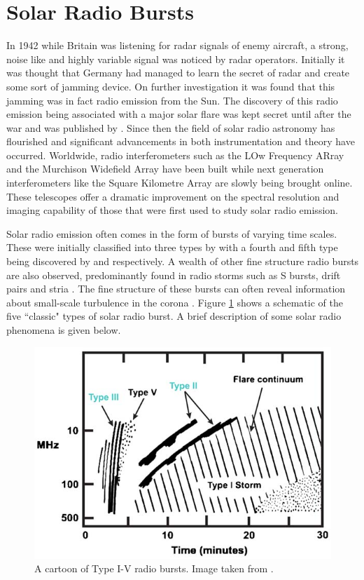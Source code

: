 \section{Solar Radio Bursts}
In 1942 while Britain was listening for radar signals of enemy aircraft, a strong, noise like and highly variable signal was noticed by radar operators. Initially it was thought that Germany had managed to learn the secret of radar and create some sort of jamming device. On further investigation it was found that this jamming was in fact radio emission from the Sun. The discovery of this radio emission being associated with a major solar flare was kept secret until after the war and was published by \cite{Appleton1946}.
Since then the field of solar radio astronomy has flourished and significant advancements in both instrumentation and theory have occurred. Worldwide, radio interferometers such as the LOw Frequency ARray \cite[LOFAR;][]{VanHaarlem2013} and the Murchison Widefield Array \citep[MWA;][]{Lonsdale2009} have been built while next generation interferometers like the Square Kilometre Array \citep[SKA;][]{McMullin2020} are slowly being brought online. These telescopes offer a dramatic improvement on the spectral resolution and imaging capability of those that were first used to study solar radio emission.

Solar radio emission often comes in the form of bursts of varying time scales. These were initially classified into three types by \cite{Wild1950b} with a fourth and fifth type being discovered by \cite{Boischot1957} and \cite{Wild1959} respectively. A wealth of other fine structure radio bursts are also observed, predominantly found in radio storms such as S bursts, drift pairs and stria \citep{McConnell1980,Melrose1982,NelsonandMelrose1985}. 
The fine structure of these bursts can often reveal information about small-scale turbulence in the corona \citep{Reid2021}.
Figure \ref{fig:burst_cartoon} shows a schematic of the five ``classic" types of solar radio burst. A brief description of some solar radio phenomena is given below.
\begin{figure}[ht]
    \centering
    \includegraphics[width=0.75\columnwidth]{Images/Burst_cartoon.jpg}
    \caption[Cartoon of Type I-V radio bursts.]{A cartoon of Type I-V radio bursts. Image taken from \cite{Cliver2009}.}
    \label{fig:burst_cartoon}
\end{figure}
